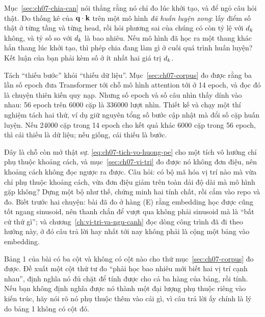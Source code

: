 \tierextend

\begin{bt}
  \item Mục~\ref{sec:ch07-chia-can} nói thẳng rằng nó chỉ đo lúc khởi tạo, và
    để ngỏ câu hỏi thật. Đo thống kê của \(\mathbf{q} \cdot \mathbf{k}\) trên một mô
    hình \emph{đã huấn luyện xong}: lấy điểm số thật ở từng tầng và từng head,
    rồi hỏi phương sai của chúng có còn tỷ lệ với \(d_{k}\) không, và tỷ số so với
    \(d_{k}\) là bao nhiêu. Nếu mô hình đã học ra một thang khác hẳn thang lúc
    khởi tạo, thì phép chia đang làm gì ở cuối quá trình huấn luyện? Kết luận
    của bạn phải kèm số ở ít nhất hai giá trị \(d_{k}\).

  \item Tách \enquote{thiếu bước} khỏi \enquote{thiếu dữ liệu}.
    Mục~\ref{sec:ch07-corpus} đo được rằng ba lần số epoch đưa Transformer tới
    chỗ mô hình attention tới ở 14 epoch, và đọc đó là chuyện thiên kiến quy
    nạp. Nhưng số epoch và số câu nhìn thấy dính vào nhau: 56 epoch trên 6000
    cặp là 336000 lượt nhìn. Thiết kế và chạy một thí nghiệm tách hai thứ, ví
    dụ giữ nguyên tổng số bước cập nhật mà đổi số cặp huấn luyện. Nếu 24000 cặp
    trong 14 epoch cho kết quả khác 6000 cặp trong 56 epoch, thì cái thiếu là
    dữ liệu; nếu giống, cái thiếu là bước.

  \item Đây là chỗ còn mở thật sự. \eqref{eq:ch07-tich-vo-huong-pe} cho một tích
    vô hướng chỉ phụ thuộc khoảng cách, và mục~\ref{sec:ch07-vi-tri} đo được nó
    không đơn điệu, nên khoảng cách không đọc ngược ra được. Câu hỏi: có bộ mã
    hóa vị trí nào mà  vừa chỉ phụ thuộc khoảng
    cách, vừa đơn điệu
    giảm trên toàn dải độ dài mà mô hình gặp không? Dựng một bộ như thế, chứng
    minh hai tính chất, rồi cắm vào repo và đo. Biết trước hai chuyện: bài đã đo
    ở hàng (E) rằng embedding học được cũng tốt ngang sinusoid, nên thanh chắn
    để vượt qua không phải sinusoid mà là \enquote{bất cứ thứ gì}; và
    chương~\ref{ch:vi-tri-va-ngu-canh} đọc dòng công trình đã đi theo hướng
    này, ở đó câu trả lời hay nhất tới nay không phải là cộng một bảng vào
    embedding.

  \item Bảng 1 của bài có ba cột và không có cột nào cho thứ
    mục~\ref{sec:ch07-corpus} đo được. Đề xuất một cột thứ tư đo \enquote{phải
    học bao nhiêu mới biết hai vị trí cạnh nhau}, định nghĩa nó đủ chặt để tính
    được cho cả ba hàng của bảng, rồi tính. Nếu bạn không định nghĩa được nó
    thành một đại lượng phụ thuộc riêng vào kiến trúc, hãy nói rõ nó phụ thuộc
    thêm vào cái gì, vì câu trả lời ấy chính là lý do bảng 1 không có cột đó.
\end{bt}

